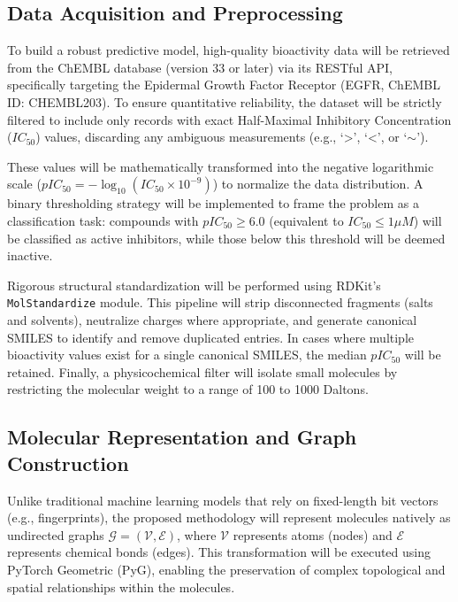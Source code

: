 \subsection{Data Acquisition and Preprocessing}

To build a robust predictive model, high-quality bioactivity data will be retrieved from the ChEMBL database (version 33 or later) via its RESTful API, specifically targeting the Epidermal Growth Factor Receptor (EGFR, ChEMBL ID: CHEMBL203). To ensure quantitative reliability, the dataset will be strictly filtered to include only records with exact Half-Maximal Inhibitory Concentration ($IC_{50}$) values, discarding any ambiguous measurements (e.g., `>', `<', or `$\sim$'). 

These values will be mathematically transformed into the negative logarithmic scale ($pIC_{50} = -\log_{10}(IC_{50} \times 10^{-9})$) to normalize the data distribution. A binary thresholding strategy will be implemented to frame the problem as a classification task: compounds with $pIC_{50} \geq 6.0$ (equivalent to $IC_{50} \leq 1 \mu M$) will be classified as active inhibitors, while those below this threshold will be deemed inactive.

Rigorous structural standardization will be performed using RDKit's \texttt{MolStandardize} module. This pipeline will strip disconnected fragments (salts and solvents), neutralize charges where appropriate, and generate canonical SMILES to identify and remove duplicated entries. In cases where multiple bioactivity values exist for a single canonical SMILES, the median $pIC_{50}$ will be retained. Finally, a physicochemical filter will isolate small molecules by restricting the molecular weight to a range of 100 to 1000 Daltons.

\subsection{Molecular Representation and Graph Construction}

Unlike traditional machine learning models that rely on fixed-length bit vectors (e.g., fingerprints), the proposed methodology will represent molecules natively as undirected graphs $\mathcal{G} = (\mathcal{V}, \mathcal{E})$, where $\mathcal{V}$ represents atoms (nodes) and $\mathcal{E}$ represents chemical bonds (edges). This transformation will be executed using PyTorch Geometric (PyG), enabling the preservation of complex topological and spatial relationships within the molecules.

